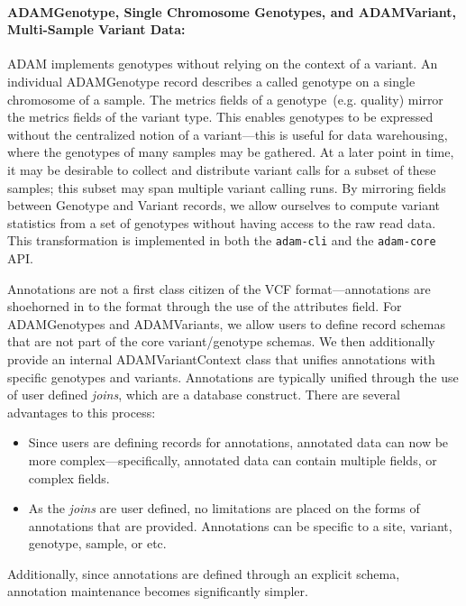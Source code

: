 \documentclass{bioinfo}
\begin{document}
\paragraph{ADAMGenotype, Single Chromosome Genotypes, and ADAMVariant, Multi-Sample Variant Data:}
\label{sec:adamvariant}

ADAM implements genotypes without relying on the context of a variant. An individual ADAMGenotype record describes a called genotype on a single chromosome of a
sample. The metrics fields of a genotype~(e.g. quality) mirror the metrics fields of the variant type. This enables genotypes to be expressed without the centralized notion
of a variant---this is useful for data warehousing, where the genotypes of many samples may be gathered. At a later point in time, it may be desirable to collect and distribute
variant calls for a subset of these samples; this subset may span multiple variant calling runs. By mirroring fields between Genotype and Variant records, we allow ourselves
to compute variant statistics from a set of genotypes without having access to the raw read data. This transformation is implemented in both the \texttt{adam-cli} and the
\texttt{adam-core} API.

Annotations are not a first class citizen of the VCF format---annotations are shoehorned in to the format through the use of the attributes field. For ADAMGenotypes and
ADAMVariants, we allow users to define record schemas that are not part of the core variant/genotype schemas. We then additionally provide an internal ADAMVariantContext
class that unifies annotations with specific genotypes and variants. Annotations are typically unified through the use of user defined \emph{joins}, which are a database
construct. There are several advantages to this process:

\begin{itemize}
\item Since users are defining records for annotations, annotated data can now be more complex---specifically, annotated data can contain multiple fields, or complex fields.
\item As the \emph{joins} are user defined, no limitations are placed on the forms of annotations that are provided. Annotations can be specific to a site, variant, genotype,
sample, or etc.
\end{itemize}

Additionally, since annotations are defined through an explicit schema, annotation maintenance becomes significantly simpler.
\end{document}
